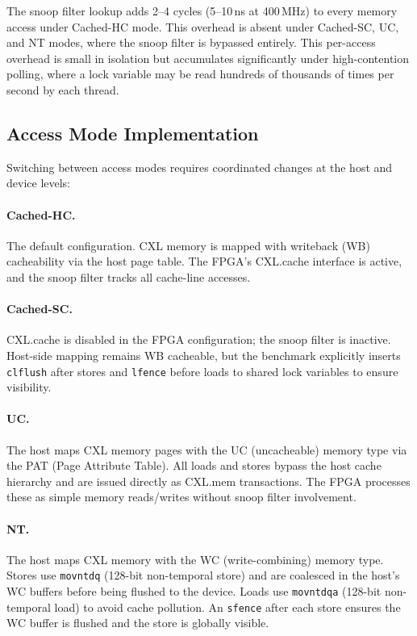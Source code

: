 The snoop filter lookup adds 2--4 cycles (5--10\,ns at 400\,MHz) to every memory access under Cached-HC mode.
This overhead is absent under Cached-SC, UC, and NT modes, where the snoop filter is bypassed entirely.
This per-access overhead is small in isolation but accumulates significantly under high-contention polling, where a lock variable may be read hundreds of thousands of times per second by each thread.

\subsection{Access Mode Implementation}

Switching between access modes requires coordinated changes at the host and device levels:

\paragraph{Cached-HC.}
The default configuration.
CXL memory is mapped with writeback (WB) cacheability via the host page table.
The FPGA's CXL.cache interface is active, and the snoop filter tracks all cache-line accesses.

\paragraph{Cached-SC.}
CXL.cache is disabled in the FPGA configuration; the snoop filter is inactive.
Host-side mapping remains WB cacheable, but the benchmark explicitly inserts \texttt{clflush} after stores and \texttt{lfence} before loads to shared lock variables to ensure visibility.

\paragraph{UC.}
The host maps CXL memory pages with the UC (uncacheable) memory type via the PAT (Page Attribute Table).
All loads and stores bypass the host cache hierarchy and are issued directly as CXL.mem transactions.
The FPGA processes these as simple memory reads/writes without snoop filter involvement.

\paragraph{NT.}
The host maps CXL memory with the WC (write-combining) memory type.
Stores use \texttt{movntdq} (128-bit non-temporal store) and are coalesced in the host's WC buffers before being flushed to the device.
Loads use \texttt{movntdqa} (128-bit non-temporal load) to avoid cache pollution.
An \texttt{sfence} after each store ensures the WC buffer is flushed and the store is globally visible.

